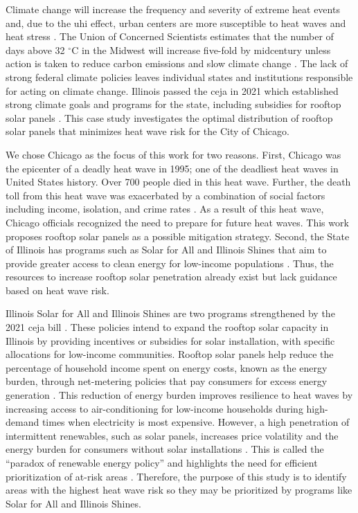 Climate change will increase the frequency and severity of extreme heat events and,
due to the \ac{uhi} effect, urban centers are more susceptible to heat waves and
heat stress \cite{zhao_strong_2014,dahl_killer_2019}. The Union of Concerned
Scientists estimates that the number of days above 32 $^\circ$C in the Midwest
will increase five-fold by midcentury unless action is taken to reduce carbon
emissions and slow climate change  \cite{dahl_killer_2019}. The lack of strong
federal climate policies leaves individual states and institutions responsible
for acting on climate change. Illinois passed the \ac{ceja} in 2021 which established
strong climate goals and programs for the state, including subsidies for rooftop
solar panels \cite{harmon_climate_2021}. This case study investigates the optimal
distribution of rooftop solar panels that minimizes heat wave risk for the City of
Chicago.

We chose Chicago as the focus of this work for two reasons. First, Chicago was the
epicenter of a deadly heat wave in 1995; one of the deadliest heat waves in United
States history. Over 700 people died in this heat wave\cite{klinenberg_heat_2003}.
Further, the death toll from this heat wave was exacerbated by a combination of
social factors including income, isolation, and crime rates \cite{klinenberg_heat_2003}.
As a result of this heat wave, Chicago officials recognized the need to prepare
for future heat waves. This
work proposes rooftop solar panels as a possible mitigation strategy.
Second, the State of Illinois has programs such as Solar for All and Illinois
Shines that aim to provide greater access to clean energy for low-income populations
\cite{illinois_solar_for_all_environmental_2022}. Thus, the resources to increase
rooftop solar penetration already exist but lack guidance based on heat wave risk.

Illinois Solar for All and Illinois Shines are two programs strengthened by the
2021 \ac{ceja} bill \cite{harmon_climate_2021,illinois_solar_for_all_environmental_2022}.
These policies intend to expand the rooftop solar capacity in Illinois by providing
incentives or subsidies for solar installation, with specific allocations for
low-income communities. Rooftop solar
panels help reduce the percentage of household income spent on energy costs,
known as the energy burden, through net-metering policies that pay consumers for
excess energy generation \cite{brown_high_2020}. This reduction of energy burden
improves resilience to heat waves by increasing access to air-conditioning for
low-income households during high-demand times when electricity is most expensive.
However, a high penetration of intermittent renewables, such as solar panels,
increases price volatility and the energy burden for consumers without solar
installations \cite{rai_impact_2020,johnathon_analyzing_2021}. This is called the
``paradox of renewable energy policy'' and highlights the need for efficient
prioritization of at-risk areas \cite{blazquez_renewable_2018}.
Therefore, the purpose of this study is to identify areas with the highest heat
wave risk so they may be prioritized by programs like Solar for All and Illinois
Shines.

